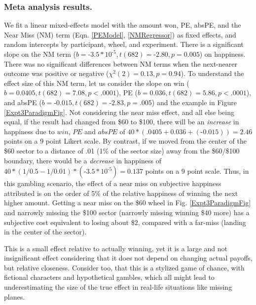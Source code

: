\documentclass[10pt,letterpaper]{article}
\newcommand{\red}[1]{\textcolor{Red}{#1}}
\begin{document}
\subsubsection{Meta analysis results.}

We fit a linear mixed-effects model with the amount won, PE, absPE, and the Near Miss (NM) term (Eqn. \ref{PEModel}, \ref{NMRegressor}) as fixed effects, and random intercepts by participant, wheel, and experiment. There is a significant slope on the NM term ($b = \text{-}3.5 * 10^{\text{-}5}, t(682)=\text{-}2.80, p=0.005$) on happiness. There was no significant differences between NM terms when the next-nearer outcome was positive or negative ($\chi^2(2)=0.13, p=0.94$). To understand the effect size of this NM term, let us consider the slope on win ($b = 0.0405, t(682) = 7.08, p<.0001$), PE ($b=0.036, t(682)=5.86, p<.0001$), and absPE ($b=\text{-}0.015, t(682) = \text{-}2.83, p=.005$) and the example in Figure \ref{Expt3ParadigmFig}. Not considering the near miss effect, and all else being equal, if the result had changed from \$60 to \$100, there will be an \textit{increase} in happiness due to $win$, $PE$ and $absPE$ of $40*(.0405+0.036+(\text{-}0.015)) = 2.46$ points on a 9 point Likert scale. By contrast, if we moved from the center of the \$60 sector to a distance of .01 (1\% of the sector size) away from the \$60/\$100 boundary, there would be a \textit{decrease} in happiness of $40*(1/0.5 - 1/0.01)*(\text{-}3.5 * 10^{\text{-}5}) = 0.137$ points on a 9 point scale. Thus, in this gambling scenario, the effect of a near miss on subjective happiness attributed is on the order of 5\% of the relative happiness of winning the next higher amount. Getting a near miss on the \$60 wheel in Fig. \ref{Expt3ParadigmFig} and narrowly missing the \$100 sector (narrowly missing winning \$40 more) has a subjective cost equivalent to losing about \$2, compared with a far-miss (landing in the center of the sector). 

This is a small effect relative to actually winning, yet it is a large and not insignificant effect considering that it does not depend on changing actual payoffs, but relative closeness. Consider too, that this is a stylized game of chance, with fictional characters and hypothetical gambles, which all might lead to underestimating the size of the true effect in real-life situations like missing planes.

\end{document}

